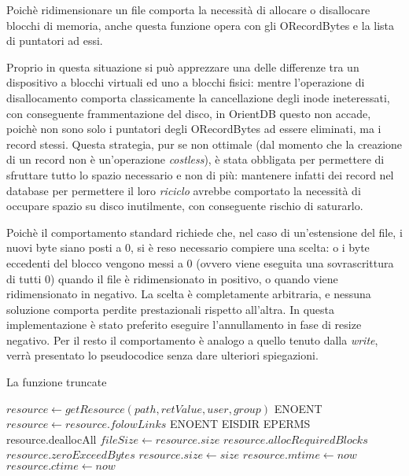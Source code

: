 Poichè ridimensionare un file comporta la necessità di allocare o disallocare blocchi di memoria, anche questa funzione opera con gli ORecordBytes e la lista di puntatori ad essi.

Proprio in questa situazione si può apprezzare una delle differenze tra un dispositivo a blocchi virtuali ed uno a blocchi fisici: mentre l'operazione di disallocamento comporta classicamente la cancellazione degli inode ineteressati, con conseguente frammentazione del disco, in OrientDB questo non accade, poichè non sono solo i puntatori degli ORecordBytes ad essere eliminati, ma i record stessi. Questa strategia, pur se non ottimale (dal momento che la creazione di un record non è un'operazione \emph{costless}), è stata obbligata per permettere di sfruttare tutto lo spazio necessario e non di più: mantenere infatti dei record nel database per permettere il loro \emph{riciclo} avrebbe comportato la necessità di occupare spazio su disco inutilmente, con conseguente rischio di saturarlo.

Poichè il comportamento standard richiede che, nel caso di un'estensione del file, i nuovi byte siano posti a 0, si è reso necessario compiere una scelta: o i byte eccedenti del blocco vengono messi a 0 (ovvero viene eseguita una sovrascrittura di tutti 0) quando il file è ridimensionato in positivo, o quando viene ridimensionato in negativo. La scelta è completamente arbitraria, e nessuna soluzione comporta perdite prestazionali rispetto all'altra. In questa implementazione è stato preferito eseguire l'annullamento in fase di resize negativo. Per il resto il comportamento è analogo a quello tenuto dalla \emph{write}, verrà presentato lo pseudocodice senza dare ulteriori spiegazioni.

\begin{algorithm}
\begin{algorithmic}[5]
\caption{La funzione truncate}
	\State $resource \gets getResource(path, retValue, user, group)$
		\State \Return ENOENT
	\EndIf
		\State $resource \gets resource.folowLinks$
	\EndIf
		\State \Return ENOENT
		\State \Return EISDIR
	\EndIf
		\State \Return EPERMS
	\EndIf
		\State resource.deallocAll
		\State {}
	\EndIf	
	\State $fileSize \gets resource.size$
		\State {}
	\EndIf
	\State $resource.allocRequiredBlocks$	
		\State $resource.zeroExceedBytes$
	\EndIf
	\State $resource.size \gets size$
	\State $resource.mtime \gets now$
	\State $resource.ctime \gets now$
	\State {}
\EndFunction
\end{algorithmic}
\end{algorithm}

